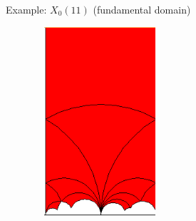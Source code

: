 \begin{frame}{Example: $X_0(11)$ (fundamental domain)}

  \begin{center}
    \includegraphics[width=7cm, height=7cm]{slides/fun-domain-Gamma011.png}
  \end{center}




\end{frame}
